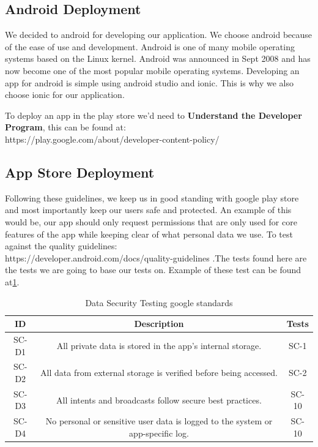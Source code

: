 \documentclass[a4paper,12pt]{report}
\begin{document}
\subsection{Android Deployment}
We decided to android for developing our application. We choose android because of the ease of use and development. Android is one of many mobile operating systems based on the Linux kernel. Android was announced in Sept 2008 and has now become one of the most popular mobile operating systems. Developing an app for android is simple using android studio and ionic. This is why we also choose ionic for our application. 

To deploy an app in the play store we'd need to
\textbf{Understand the Developer Program}, this can be found at:\\ https://play.google.com/about/developer-content-policy/
\subsection{App Store Deployment}
Following these guidelines, we keep us in good standing with google play store and most importantly keep our users safe and protected. An example of this would be, our app should only request permissions that are only used for core features of the app while keeping clear of what personal data we use. To test against the quality guidelines:\\ https://developer.android.com/docs/quality-guidelines .The tests found here are the tests we are going to base our tests on. Example of these test can be found at\ref{tab:SecurityTest}.


\begin{table}[h]
\begin{tabular}{||c c c||} 
 \hline
 \textbf{ID} & \textbf{Description} & \textbf{Tests} \\ [0.5ex] 
 \hline\hline
 SC-D1 & All private data is stored in the app's internal storage. & SC-1 \\ 
 \hline
 SC-D2 & All data from external storage is verified before being accessed. & SC-2 \\  
 \hline
 SC-D3 & All intents and broadcasts follow secure best practices. & SC-10 \\
 \hline
 SC-D4 & No personal or sensitive user data is logged to the system or app-specific log. & SC-10 \\
 \hline
\end{tabular}
\caption{Data Security Testing google standards}
\label{tab:SecurityTest}
\end{table}
\end{document}
